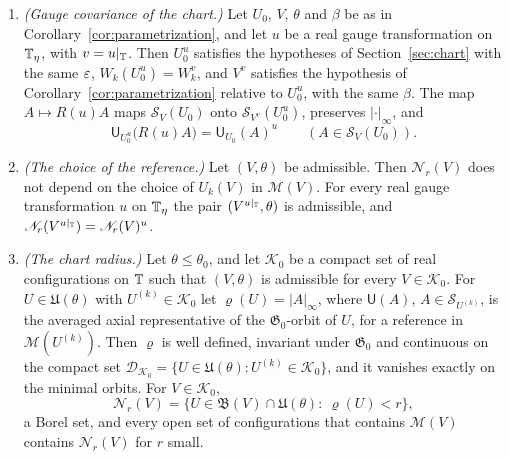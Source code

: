 \begin{lemma}\label{lem:ol-chart-covariance}
\begin{enumerate}[label=(\alph*)]
\item \emph{(Gauge covariance of the chart.)} Let $U_0$, $V$, $\theta$ and $\beta$ be as in Corollary~\ref{cor:parametrization}, and let $u$ be a real gauge transformation on $\mathbb T_\eta$, with $v=u|_\mathbb T$. Then $U_0^u$ satisfies the hypotheses of Section~\ref{sec:chart} with the same $\varepsilon$, $W_k(U_0^u)=W_k^v$, and $V^v$ satisfies the hypothesis of Corollary~\ref{cor:parametrization} relative to $U_0^u$, with the same $\beta$. The map $A\mapsto R(u)A$ maps $\mathcal S_V(U_0)$ onto $\mathcal S_{V^v}(U_0^u)$, preserves $|\cdot|_\infty$, and
\[
\mathsf U_{U_0^u}\big(R(u)A\big)=\mathsf U_{U_0}(A)^u\qquad(A\in\mathcal S_V(U_0)).
\]
\item \emph{(The choice of the reference.)} Let $(V,\theta)$ be admissible. Then $\mathscr N_r(V)$ does not depend on the choice of $U_k(V)$ in $\mathscr M(V)$. For every real gauge transformation $u$ on $\mathbb T_\eta$ the pair $(V^{u|_\mathbb T},\theta)$ is admissible, and $\mathscr N_r(V^{u|_\mathbb T})=\mathscr N_r(V)^u$.
\item \emph{(The chart radius.)} Let $\theta\le\theta_0$, and let $\mathcal K_0$ be a compact set of real configurations on $\mathbb T$ such that $(V,\theta)$ is admissible for every $V\in\mathcal K_0$. For $U\in\mathfrak U(\theta)$ with $U^{(k)}\in\mathcal K_0$ let $\varrho(U)=|A|_\infty$, where $\mathsf U(A)$, $A\in\mathcal S_{U^{(k)}}$, is the averaged axial representative of the $\mathfrak G_0$-orbit of $U$, for a reference in $\mathscr M(U^{(k)})$. Then $\varrho$ is well defined, invariant under $\mathfrak G_0$ and continuous on the compact set $\mathcal D_{\mathcal K_0}=\{U\in\mathfrak U(\theta):U^{(k)}\in\mathcal K_0\}$, and it vanishes exactly on the minimal orbits. For $V\in\mathcal K_0$,
\[
\mathscr N_r(V)=\{U\in\mathfrak B(V)\cap\mathfrak U(\theta):\ \varrho(U)<r\},
\]
a Borel set, and every open set of configurations that contains $\mathscr M(V)$ contains $\mathscr N_r(V)$ for $r$ small.
\end{enumerate}
\end{lemma}

